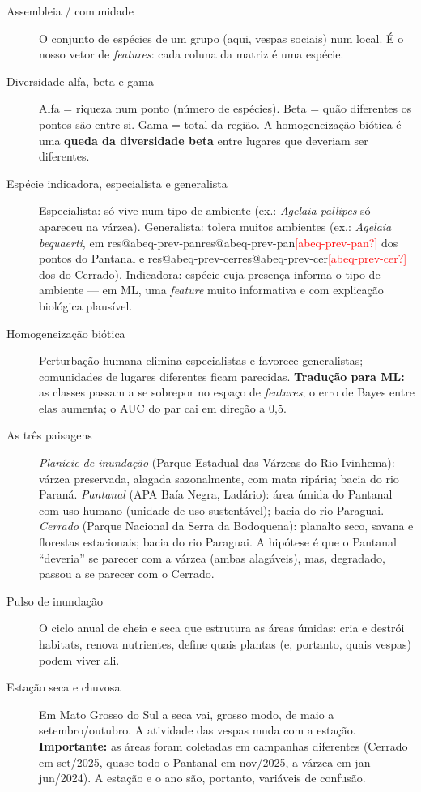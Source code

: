\documentclass[11pt,a4paper]{article}
\makeatletter
\newcommand{\res}[1]{\ifcsname res@#1\endcsname\csname res@#1\endcsname\else\textcolor{red}{[#1?]}\fi}
\newcommand{\taxon}[1]{\textit{#1}}
\makeatother
\begin{document}
\begin{description}
\item[Assembleia / comunidade] O conjunto de espécies de um grupo (aqui, vespas sociais) num local.
É o nosso vetor de \emph{features}: cada coluna da matriz é uma espécie.

\item[Diversidade alfa, beta e gama] Alfa = riqueza num ponto (número de espécies). Beta = quão
diferentes os pontos são entre si. Gama = total da região. A homogeneização biótica é uma
\textbf{queda da diversidade beta} entre lugares que deveriam ser diferentes.

\item[Espécie indicadora, especialista e generalista] Especialista: só vive num tipo de ambiente
(ex.: \taxon{Agelaia pallipes} só apareceu na várzea). Generalista: tolera muitos ambientes (ex.:
\taxon{Agelaia bequaerti}, em \res{abeq-prev-pan} dos pontos do Pantanal e \res{abeq-prev-cer} dos do
Cerrado). Indicadora: espécie cuja presença informa o tipo de ambiente --- em ML, uma
\emph{feature} muito informativa e com explicação biológica plausível.

\item[Homogeneização biótica] Perturbação humana elimina especialistas e favorece generalistas;
comunidades de lugares diferentes ficam parecidas. \textbf{Tradução para ML:} as classes passam a
se sobrepor no espaço de \emph{features}; o erro de Bayes entre elas aumenta; o AUC do par cai em
direção a 0,5.

\item[As três paisagens]
\emph{Planície de inundação} (Parque Estadual das Várzeas do Rio Ivinhema): várzea preservada,
alagada sazonalmente, com mata ripária; bacia do rio Paraná.
\emph{Pantanal} (APA Baía Negra, Ladário): área úmida do Pantanal com uso humano (unidade de uso
sustentável); bacia do rio Paraguai.
\emph{Cerrado} (Parque Nacional da Serra da Bodoquena): planalto seco, savana e florestas
estacionais; bacia do rio Paraguai.
A hipótese é que o Pantanal ``deveria'' se parecer com a várzea (ambas alagáveis), mas, degradado,
passou a se parecer com o Cerrado.

\item[Pulso de inundação] O ciclo anual de cheia e seca que estrutura as áreas úmidas: cria e
destrói habitats, renova nutrientes, define quais plantas (e, portanto, quais vespas) podem viver ali.

\item[Estação seca e chuvosa] Em Mato Grosso do Sul a seca vai, grosso modo, de maio a
setembro/outubro. A atividade das vespas muda com a estação. \textbf{Importante:} as áreas foram
coletadas em campanhas diferentes (Cerrado em set/2025, quase todo o Pantanal em nov/2025, a
várzea em jan--jun/2024). A estação e o ano são, portanto, variáveis de confusão.


\end{description}
\end{document}
